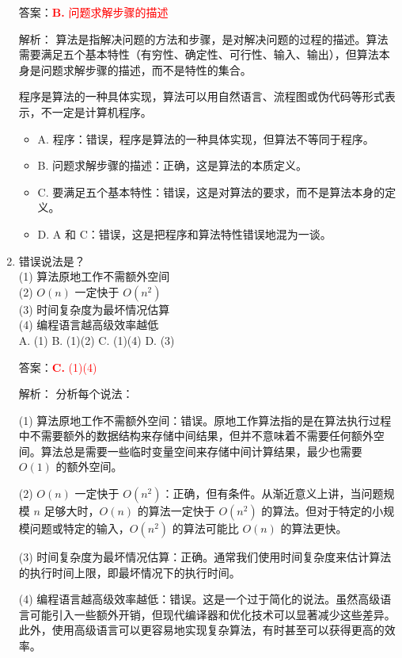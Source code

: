 \documentclass[lang=cn,newtx,10pt,scheme=chinese]{../../../elegantbook}
\begin{document}
\begin{enumerate}
    答案：\textcolor{red}{\textbf{B.} 问题求解步骤的描述}

    解析：
    算法是指解决问题的方法和步骤，是对解决问题的过程的描述。算法需要满足五个基本特性（有穷性、确定性、可行性、输入、输出），但算法本身是问题求解步骤的描述，而不是特性的集合。
    
    程序是算法的一种具体实现，算法可以用自然语言、流程图或伪代码等形式表示，不一定是计算机程序。

    \begin{itemize}
        \item A. 程序：错误，程序是算法的一种具体实现，但算法不等同于程序。
        \item B. 问题求解步骤的描述：正确，这是算法的本质定义。
        \item C. 要满足五个基本特性：错误，这是对算法的要求，而不是算法本身的定义。
        \item D. A 和 C：错误，这是把程序和算法特性错误地混为一谈。
    \end{itemize}

    \item 错误说法是？\\
    (1) 算法原地工作不需额外空间 \\ (2) $O(n)$ 一定快于 $O(n^2)$ \\ (3) 时间复杂度为最坏情况估算 \\ (4) 编程语言越高级效率越低 \\
    A. (1) \quad B. (1)(2) \quad C. (1)(4) \quad D. (3)

    答案：\textcolor{red}{\textbf{C.} (1)(4)}

    解析：
    分析每个说法：
    
    (1) 算法原地工作不需额外空间：错误。原地工作算法指的是在算法执行过程中不需要额外的数据结构来存储中间结果，但并不意味着不需要任何额外空间。算法总是需要一些临时变量空间来存储中间计算结果，最少也需要 $O(1)$ 的额外空间。
    
    (2) $O(n)$ 一定快于 $O(n^2)$：正确，但有条件。从渐近意义上讲，当问题规模 $n$ 足够大时，$O(n)$ 的算法一定快于 $O(n^2)$ 的算法。但对于特定的小规模问题或特定的输入，$O(n^2)$ 的算法可能比 $O(n)$ 的算法更快。
    
    (3) 时间复杂度为最坏情况估算：正确。通常我们使用时间复杂度来估计算法的执行时间上限，即最坏情况下的执行时间。
    
    (4) 编程语言越高级效率越低：错误。这是一个过于简化的说法。虽然高级语言可能引入一些额外开销，但现代编译器和优化技术可以显著减少这些差异。此外，使用高级语言可以更容易地实现复杂算法，有时甚至可以获得更高的效率。


\end{enumerate}
\end{document}
